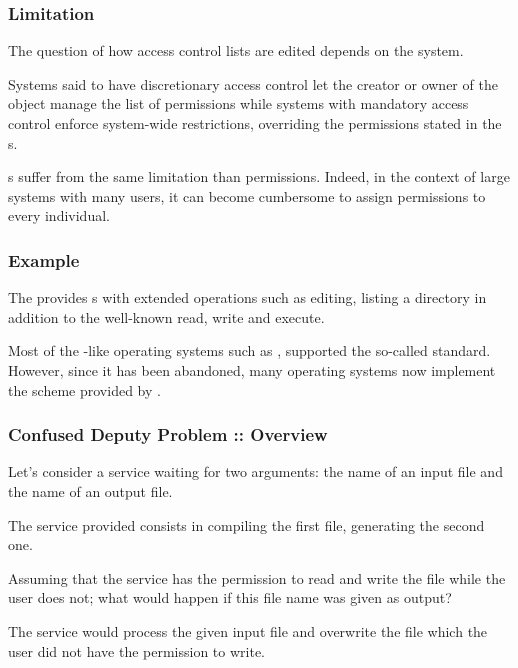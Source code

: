 \begin{frame}
  \frametitle{Limitation}

  The question of how access control lists are edited depends on the system.

  \-

  Systems said to have discretionary access control let the creator or owner
  of the object manage the list of permissions while systems with mandatory
  access control enforce system-wide restrictions, overriding the permissions
  stated in the s.

  \-

  s suffer from the same limitation than  permissions.
  Indeed, in the context of large systems with many users, it can become
  cumbersome to assign permissions to every individual.
\end{frame}


\begin{frame}
  \frametitle{Example}

  The  provides s with extended
  operations such as editing, listing a directory \etc{} in addition to the
  well-known read, write and execute.

  \-

  Most of the -like operating systems such as ,
   \etc{} supported the so-called  standard.
  However, since it has been abandoned, many operating systems now implement
  the  scheme provided by  .
\end{frame}


\begin{frame}
  \frametitle{Confused Deputy Problem :: Overview}

  Let's consider a service waiting for two arguments: the name of an input
  file and the name of an output file.

  \-

  The service provided consists in compiling the first file, generating the
  second one.

  \-

  Assuming that the service has the permission to read and write the
   file while the user does not; what would happen
  if this file name was given as output?

  \-

  The service would process the given input file and overwrite the
   file which the user did not have the permission
  to write.
\end{frame}

